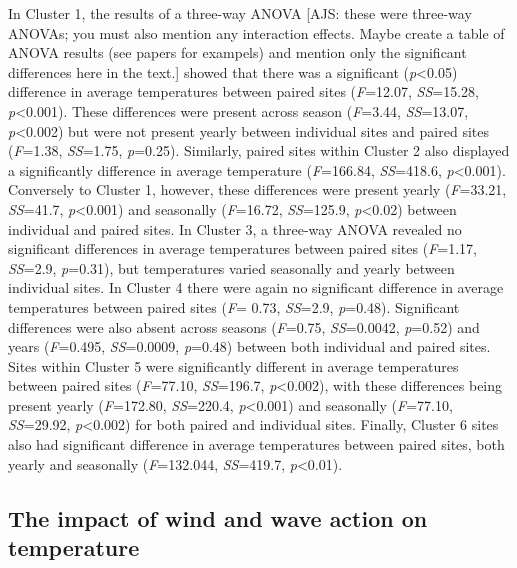 \documentclass[12pt,a4paper,]{article}
\begin{document}
In Cluster 1, the results of a three-way ANOVA {[}AJS: these were
three-way ANOVAs; you must also mention any interaction effects. Maybe
create a table of ANOVA results (see papers for exampels) and mention
only the significant differences here in the text.{]} showed that there
was a significant (\emph{p}\textless{}0.05) difference in average
temperatures between paired sites (\emph{F}=12.07, \emph{SS}=15.28,
\emph{p}\textless{}0.001). These differences were present across season
(\emph{F}=3.44, \emph{SS}=13.07, \emph{p}\textless{}0.002) but were not
present yearly between individual sites and paired sites (\emph{F}=1.38,
\emph{SS}=1.75, \emph{p}=0.25). Similarly, paired sites within Cluster 2
also displayed a significantly difference in average temperature
(\emph{F}=166.84, \emph{SS}=418.6, \emph{p}\textless{}0.001). Conversely
to Cluster 1, however, these differences were present yearly
(\emph{F}=33.21, \emph{SS}=41.7, \emph{p}\textless{}0.001) and
seasonally (\emph{F}=16.72, \emph{SS}=125.9, \emph{p}\textless{}0.02)
between individual and paired sites. In Cluster 3, a three-way ANOVA
revealed no significant differences in average temperatures between
paired sites (\emph{F}=1.17, \emph{SS}=2.9, \emph{p}=0.31), but
temperatures varied seasonally and yearly between individual sites. In
Cluster 4 there were again no significant difference in average
temperatures between paired sites (\emph{F}= 0.73, \emph{SS}=2.9,
\emph{p}=0.48). Significant differences were also absent across seasons
(\emph{F}=0.75, \emph{SS}=0.0042, \emph{p}=0.52) and years
(\emph{F}=0.495, \emph{SS}=0.0009, \emph{p}=0.48) between both
individual and paired sites. Sites within Cluster 5 were significantly
different in average temperatures between paired sites (\emph{F}=77.10,
\emph{SS}=196.7, \emph{p}\textless{}0.002), with these differences being
present yearly (\emph{F}=172.80, \emph{SS}=220.4,
\emph{p}\textless{}0.001) and seasonally (\emph{F}=77.10,
\emph{SS}=29.92, \emph{p}\textless{}0.002) for both paired and
individual sites. Finally, Cluster 6 sites also had significant
difference in average temperatures between paired sites, both yearly and
seasonally (\emph{F}=132.044, \emph{SS}=419.7, \emph{p}\textless{}0.01).

\hypertarget{the-impact-of-wind-and-wave-action-on-temperature}{%
\subsection{The impact of wind and wave action on
temperature}\label{the-impact-of-wind-and-wave-action-on-temperature}}
\end{document}
